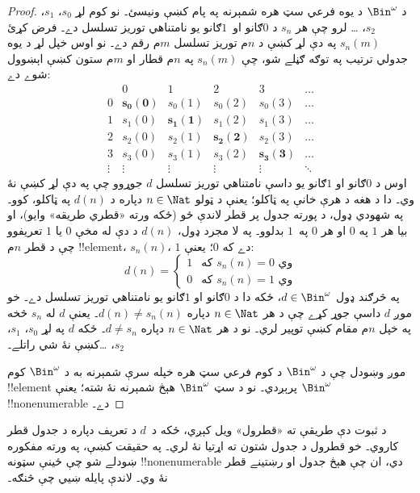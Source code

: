 \documentclass[../../../include/open-logic-section]{subfiles}
\begin{document}
\begin{proof}
د $\Bin^\omega$ د يوه فرعي سټ هره شمېرنه په پام کښې ونيسئ۔ نو
کوم لړ $s_{0}$، $s_{1}$، $s_{2}$، \dots{} لرو چې هر $s_n$ د
$0$ګانو او~$1$ګانو يو نامتناهي توريز تسلسل دے۔ فرض کړئ
$s_n(m)$ په دې لړ کښې د $n$م توريز تسلسل $m$م رقم دے۔
نو اوس خپل لړ د يوه جدولي
ترتيب په توګه ګڼلے شو، چې $s_n(m)$ په $n$م قطار او $m$م ستون
کښې اېښوول شوے دے:
\[
\begin{array}{c|c|c|c|c|c}
& 0 & 1 & 2 & 3 & \dots \\\hline
0 & \mathbf{s_{0}(0)} & s_{0}(1) & s_{0}(2) & s_0(3) & \dots \\\hline
1 & s_{1}(0)& \mathbf{s_{1}(1)} & s_1(2) & s_1(3) & \dots \\\hline
2 & s_{2}(0)& s_{2}(1) & \mathbf{s_2(2)} & s_2(3) & \dots \\\hline
3 & s_{3}(0)& s_{3}(1) & s_3(2) & \mathbf{s_3(3)} & \dots \\\hline
\vdots & \vdots & \vdots & \vdots & \vdots & \mathbf{\ddots}
\end{array}
\]
اوس د $0$ګانو او $1$ګانو يو داسې نامتناهي توريز تسلسل $d$
جوړوو چې په دې لړ کښې نۀ وي۔ دا د هغه د هرې خانې په ټاکلو؛
يعنې د ټولو $n \in \Nat$ دپاره د $d(n)$ په ټاکلو، کوو۔ په شهودي
ډول، د پورته جدول پر قطر لاندې ځو (ځکه ورته «قطري طريقه» وايو)،
او بيا هر $1$ په $0$ او هر $0$ په~$1$ بدلوو۔
په لا مجرد ډول، $d(n)$ د دې له
مخې $0$ يا $1$ تعريفوو چې د قطر $n$م !!{element}، $s_n(n)$،
$1$ دے که $0$؛ يعنې:
\[
d(n) =
\begin{cases}
1 & \text{که $s_{n}(n) = 0$ وي}\\
0 & \text{که $s_{n}(n) = 1$ وي}
\end{cases}
\]
په څرګند ډول $d \in \Bin^\omega$، ځکه دا د $0$ګانو او $1$ګانو
يو نامتناهي توريز تسلسل دے۔ خو موږ $d$ داسې جوړ کړے چې د هر
$n \in \Nat$ دپاره $d(n) \neq s_n(n)$۔ يعنې $d$ له $s_n$ څخه
په خپل $n$م مقام کښې توپير لري۔ نو د هر $n\in \Nat$ دپاره
$d \neq s_n$۔ ځکه $d$ په لړ $s_0$، $s_1$، $s_2$،
\dots کښې نۀ شي راتلے۔

موږ وښودل چې د $\Bin^\omega$ د کوم فرعي سټ هره خپله سرې شمېرنه
به د $\Bin^\omega$ کوم !!{element} پرېږدي۔ نو د سټ
$\Bin^\omega$ هېڅ شمېرنه نۀ شته؛ يعنې $\Bin^\omega$
!!{nonenumerable} دے۔
\end{proof}

\begin{explain}
د ثبوت دې طريقې ته «قطرول» ويل کېږي، ځکه د~$d$ د تعريف دپاره
د جدول قطر کاروي۔ خو قطرول د جدول شتون ته اړتيا نۀ لري۔ په
حقيقت کښې، په ورته مفکوره ښودلے شو چې ځينې سټونه
!!{nonenumerable} دي، ان چې هېڅ جدول او رښتينے قطر نۀ وي۔
لاندې پايله ښيي چې څنګه۔
\end{explain}
\end{document}
